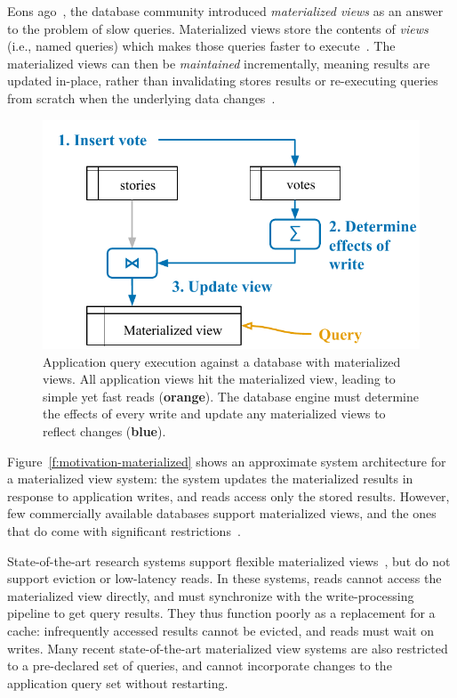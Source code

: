 
Eons ago~\cite{relational-materialized-views,stonebraker-views}, the database
community introduced \textit{materialized views} as an answer to the problem of
slow queries. Materialized views store the contents of \textit{views} (i.e.,
named queries) which makes those queries faster to
execute~\cite{materialized-views}. The materialized views can then be
\textit{maintained} incrementally, meaning results are updated in-place, rather
than invalidating stores results or re-executing queries from scratch when the
underlying data changes~\cite{materialized-survey}.

\begin{figure}
  \centering
  \includegraphics{diagrams/Motivation Materialized Views.pdf}
  \caption{Application query execution against a database with materialized
  views. All application views hit the materialized view, leading to simple
  yet fast reads (\textbf{\color{set2}orange}). The database engine must
  determine the effects of every write and update any materialized views to
  reflect changes (\textbf{\color{set1}blue}).}
  \label{f:motivation-materialized}
\end{figure}

Figure~\vref{f:motivation-materialized} shows an approximate system architecture
for a materialized view system: the system updates the materialized results in
response to application writes, and reads access only the stored results.
However, few commercially available databases support materialized views, and
the ones that do come with significant
restrictions~\cite{mssql-materialized-view-restrictions}.

State-of-the-art research systems support flexible materialized
views~\cite{dbtoaster,materialize}, but do not support eviction or low-latency
reads. In these systems, reads cannot access the materialized view directly, and
must synchronize with the write-processing pipeline to get query results. They
thus function poorly as a replacement for a cache: infrequently accessed results
cannot be evicted, and reads must wait on writes. Many recent state-of-the-art
materialized view systems are also restricted to a pre-declared set of queries,
and cannot incorporate changes to the application query set without restarting.

